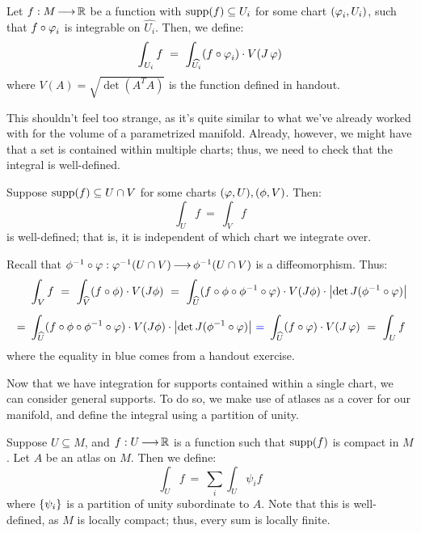 \begin{defn}
    Let $ f:M \operatorname{\longrightarrow} \mathbb{R} $ be a function with $ \operatorname{supp}(f) \subseteq U_{i} $ for
    some chart $ (\operatorname{\varphi}_{i}, U_{i}) $, such that $ f \circ \operatorname{\varphi}_{i} $ is
    integrable on $ \hat{U_{i}} $. Then, we define:
    \begin{equation*}
        \int_{U_{i}}f \ = \ \int_{\hat{U_{i}}}(f\circ\vphi_{i})\cdot V(J\vphi)
    \end{equation*}
    where $ V(A) = \sqrt{\det(A^{T}A)} $ is the function defined in handout.
\end{defn}

This shouldn't feel too strange, as it's quite similar to what we've already
worked with for the volume of a parametrized manifold. Already, however, we
might have that a set is contained within multiple charts; thus, we need to check
that the integral is well-defined.

\begin{thm}
    Suppose $ \operatorname{supp}(f) \subseteq U \cap V $ for some charts $ (\operatorname{\varphi}, U),
    (\phi, V) $. Then:
    \begin{equation*}
        \int_{U}f \ = \ \int_{V}f
    \end{equation*}
    is well-defined; that is, it is independent of which chart we integrate over.
\end{thm}

\begin{pf}
    Recall that $ \phi^{-1}\circ\operatorname{\varphi}:\operatorname{\varphi}^{-1}(U\cap V)\operatorname{\longrightarrow}\phi^{-1}
    (U\cap V) $ is a diffeomorphism. Thus:
    \begin{align*}
        & \int_{V}f \ = \ \int_{\hat{V}}(f\circ\phi)\cdot V(J\phi) \ = \
        \int_{\hat{U}}(f\circ\phi\circ\phi^{-1}\circ\vphi)\cdot V(J\phi)\cdot
        \abs{\det J(\phi^{-1}\circ\vphi)} \vsp
        \ = \ & \int_{\hat{U}}(f\circ\phi\circ\phi^{-1}\circ\vphi)\cdot V(J\phi)
        \cdot\abs{\det J(\phi^{-1}\circ\vphi)} \ \textcolor{blue}{=} \
        \int_{\hat{U}}(f\circ\vphi)\cdot V(J\vphi) \ = \ \int_{U}f
    \end{align*}
    where the equality in blue comes from a handout exercise.
\end{pf}

Now that we have integration for supports contained within a single chart, we can
consider general supports. To do so, we make use of atlases as a cover for our
manifold, and define the integral using a partition of unity.

\begin{defn}
    Suppose $ U \subseteq M $, and $ f:U \operatorname{\longrightarrow} \mathbb{R} $ is a function such that
    $ \operatorname{supp}(f) $ is compact in $ M $. Let $ A $ be an atlas on $ M $. Then we
    define:
    \begin{equation*}
        \int_{U}f \ = \ \sum_{i}\int_{U}\psi_{i}f
    \end{equation*}
    where $ \left\{{\psi_{i}}\right\} $ is a partition of unity subordinate to $ A $.
    Note that this is well-defined, as $ M $ is locally compact; thus, every
    sum is locally finite.
\end{defn}

